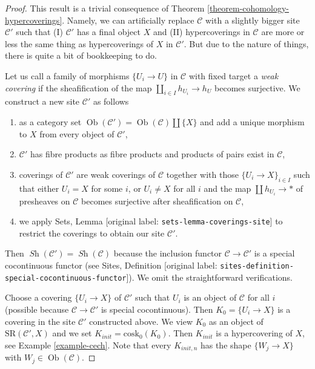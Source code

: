 \documentclass[10pt,a4paper]{article}
\theoremstyle{plain}
\theoremstyle{definition}
\theoremstyle{remark}
\numberwithin{equation}{subsection}
\def\Ob{\mathop{\mathrm{Ob}}\nolimits}
\def\Sh{\mathop{\mathit{Sh}}\nolimits}
\begin{document}
\begin{proof}
This result is a trivial consequence of
Theorem \ref{theorem-cohomology-hypercoverings}.
Namely, we can artificially replace $\mathcal{C}$ with a slightly
bigger site $\mathcal{C}'$ such that
(I) $\mathcal{C}'$ has a final object $X$ and (II)
hypercoverings in $\mathcal{C}$ are more or less the
same thing as hypercoverings of $X$ in $\mathcal{C}'$.
But due to the nature of things, there is quite a bit of
bookkeeping to do.

\medskip\noindent
Let us call a family of morphisms $\{U_i \to U\}$ in $\mathcal{C}$
with fixed target a {\it weak covering} if the sheafification of the
map $\coprod_{i \in I} h_{U_i} \to h_U$ becomes surjective.
We construct a new site $\mathcal{C}'$ as follows
\begin{enumerate}
\item as a category set $\Ob(\mathcal{C}') = \Ob(\mathcal{C}) \amalg \{X\}$
and add a unique morphism to $X$ from every object of $\mathcal{C}'$,
\item $\mathcal{C}'$ has fibre products as fibre products and products
of pairs exist in $\mathcal{C}$,
\item coverings of $\mathcal{C}'$ are weak coverings of $\mathcal{C}$
together with those $\{U_i \to X\}_{i \in I}$ such that either $U_i = X$
for some $i$, or $U_i \not = X$ for all $i$ and the map
$\coprod h_{U_i} \to *$ of presheaves on $\mathcal{C}$ becomes
surjective after sheafification on $\mathcal{C}$,
\item we apply Sets, Lemma \textnormal{[original label: \nolinkurl{sets-lemma-coverings-site}]}
to restrict the coverings to obtain our site $\mathcal{C}'$.
\end{enumerate}
Then $\Sh(\mathcal{C}') = \Sh(\mathcal{C})$ because the inclusion
functor $\mathcal{C} \to \mathcal{C}'$ is a special cocontinuous functor
(see Sites, Definition \textnormal{[original label: \nolinkurl{sites-definition-special-cocontinuous-functor}]}).
We omit the straightforward verifications.

\medskip\noindent
Choose a covering $\{U_i \to X\}$ of $\mathcal{C}'$ such that $U_i$ is an
object of $\mathcal{C}$ for all $i$ (possible because
$\mathcal{C} \to \mathcal{C}'$ is special cocontinuous).
Then $K_0 = \{U_i \to X\}$ is a covering in the
site $\mathcal{C}'$ constructed above. We view $K_0$ as an object of
$\text{SR}(\mathcal{C}', X)$ and we set $K_{init} = \text{cosk}_0(K_0)$.
Then $K_{init}$ is a hypercovering of $X$, see
Example \ref{example-cech}. Note that every $K_{init, n}$ has the shape
$\{W_j \to X\}$ with $W_j \in \Ob(\mathcal{C})$.


\end{proof}
\end{document}
